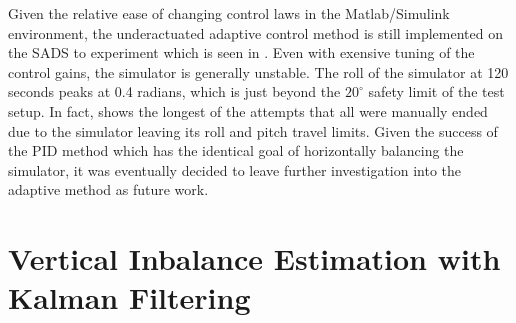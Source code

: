 Given the relative ease of changing control laws in the Matlab/Simulink environment, the underactuated adaptive control method is still implemented on the SADS to experiment which is seen in . Even with exensive tuning of the control gains, the simulator is generally unstable. The roll of the simulator at 120 seconds peaks at 0.4 radians, which is just beyond the $20^{\circ}$ safety limit of the test setup. In fact,  shows the longest of the attempts that all were manually ended due to the simulator leaving its roll and pitch travel limits. Given the success of the PID method which has the identical goal of horizontally balancing the simulator, it was eventually decided to leave further investigation into the adaptive method as future work.  


\section{Vertical Inbalance Estimation with Kalman Filtering}


